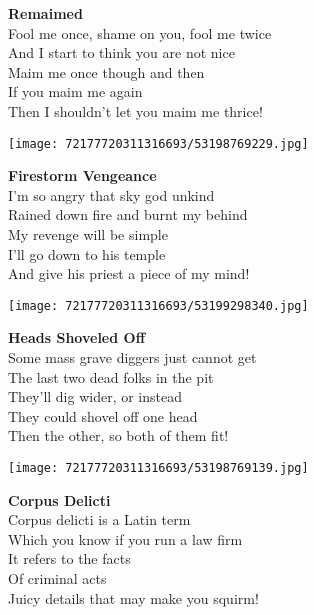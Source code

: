 \documentclass[10pt,letterpaper]{article}
\begin{document}
\begin{center}
\textbf{Remaimed}\\
\vskip 0.2in
Fool me once, shame on you, fool me twice\\
And I start to think you are not nice\\
Maim me once though and then\\
If you maim me again\\
Then I shouldn't let you maim me thrice!\\
\end{center}
\pagebreak

\begin{center}
\texttt{[image: 72177720311316693/53198769229.jpg]}
\end{center}

\begin{center}
\textbf{Firestorm Vengeance}\\
\vskip 0.2in
I'm so angry that sky god unkind\\
Rained down fire and burnt my behind\\
My revenge will be simple\\
I'll go down to his temple\\
And give his priest a piece of my mind!\\
\end{center}
\pagebreak

\begin{center}
\texttt{[image: 72177720311316693/53199298340.jpg]}
\end{center}

\begin{center}
\textbf{Heads Shoveled Off}\\
\vskip 0.2in
Some mass grave diggers just cannot get\\
The last two dead folks in the pit\\
They'll dig wider, or instead\\
They could shovel off one head\\
Then the other, so both of them fit!\\
\end{center}
\pagebreak

\begin{center}\texttt{[image: 72177720311316693/53198769139.jpg]}
\end{center}
\begin{center}
\textbf{Corpus Delicti}\\
\vskip 0.2in
Corpus delicti is a Latin term\\
Which you know if you run a law firm\\
It refers to the facts\\
Of criminal acts\\
Juicy details that may make you squirm!\\
\end{center}
\pagebreak
\end{document}
